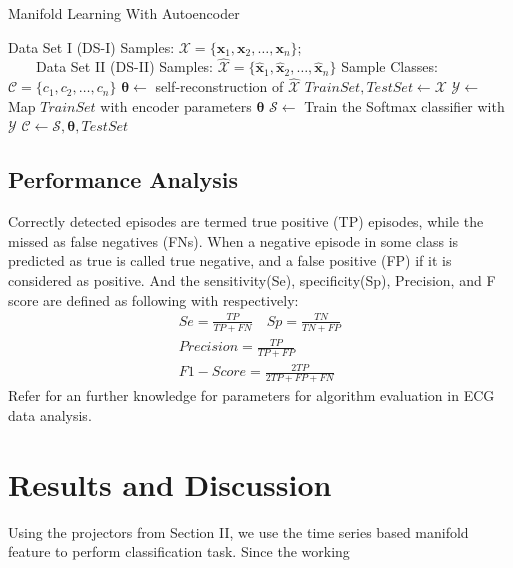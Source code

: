 \documentclass[journal]{IEEEtran}
\begin{document}
\begin{algorithm}
 \caption{Manifold Learning With Autoencoder}
 \label{alg2}
 \begin{algorithmic}
 \REQUIRE Data Set I (DS-I) Samples: $ \mathcal{X} = \{\bm{x}_1, \bm{x}_2, \ldots, \bm{x}_n\}$; \\$\quad \quad $Data Set II (DS-II) Samples: $\hat{\mathcal{X}} = \{\bm{\hat{x}}_1, \bm{\hat{x}}_2, \ldots, \bm{\hat{x}}_n\}$
 \ENSURE Sample Classes: $\mathcal{C} = \{c_1, c_2, \ldots, c_n\}$
 \STATE $\bm{\theta} \leftarrow $ self-reconstruction of $\mathcal{\hat{X}}$
  \STATE $TrainSet, TestSet \leftarrow \mathcal{X}$
  \STATE $\mathcal{Y} \leftarrow$ Map $TrainSet$ with encoder parameters $\bm{\theta}$ 
 \STATE $\mathcal{S} \leftarrow$ Train the Softmax classifier with $\mathcal{Y}$
 \STATE $\mathcal{C} \leftarrow \mathcal{S}, \bm{\theta}, TestSet$
  \end{algorithmic}
 \end{algorithm}

 


%
%

\subsection{Performance Analysis}
Correctly detected episodes are termed true positive (TP) episodes, while the missed as false negatives (FNs).
When a negative episode in some class is predicted as true is called true negative, and a false positive (FP) if it is considered as positive. And the sensitivity(Se), specificity(Sp),  Precision, and F score are defined as following with respectively:
\begin{equation}
\begin{split}
Se = \frac{TP}{TP+FN} \quad Sp = \frac{TN}{TN+FP}\\
Precision = \frac{TP}{TP + FP}\\
F1-Score = \frac{2TP}{2TP+FP+FN}
\end{split}
\end{equation}
Refer \cite{mar} for an further knowledge for parameters for algorithm evaluation in ECG data analysis.



%
%


\section{Results and Discussion}
Using the projectors from Section II, we use the time series based manifold feature to perform classification task. Since the working
\end{document}
